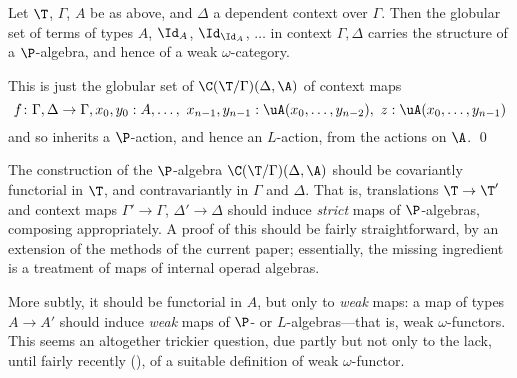 \begin{cor}Let $\T$, $\Gamma$, $A$ be as above, and $\Delta$ a dependent context over $\Gamma$.  Then the globular set of terms of types $A$, $\Id_A$, $\Id_{\Id_A}$, $\ldots$ in context $\Gamma, \Delta$ carries the structure of a $\P$-algebra, and hence of a weak $\omega$-category.
\end{cor}

\proof This is just the globular set of $\C(\T/\Gamma)(\Delta,\A)$ of context maps
\[f\colon  \Gamma, \Delta \to \Gamma, x_0,y_0:A, \ldots ,\
x_{n-1},y_{n-1}:\uA(x_0,\ldots,y_{n-2}),\ z:\uA(x_0,\ldots,y_{n-1})
\]
and so inherits a $\P$-action, and hence an $L$-action, from the actions on $\A$.
\qed

\begin{rem}[Functoriality]  The construction of the $\P$-algebra $\C(\T/\Gamma)(\Delta,\A)$ should be covariantly functorial in $\T$, and contravariantly in $\Gamma$ and $\Delta$.  That is, translations $\T \to \T'$ and context maps $\Gamma' \to \Gamma$, $\Delta' \to \Delta$ should induce \emph{strict} maps of $\P$-algebras, composing appropriately.  A proof of this should be fairly straightforward, by an extension of the methods of the current paper; essentially, the missing ingredient is a treatment of maps of internal operad algebras.

More subtly, it should be functorial in $A$, but only to \emph{weak} maps:  a map of types $A \to A'$ should induce \emph{weak} maps of $\P$- or $L$-algebras---that is, weak $\omega$-functors.  This seems an altogether trickier question, due partly but not only to the lack, until fairly recently (\cite{garner:homomorphisms}), of a suitable definition of weak $\omega$-functor.
\end{rem}

